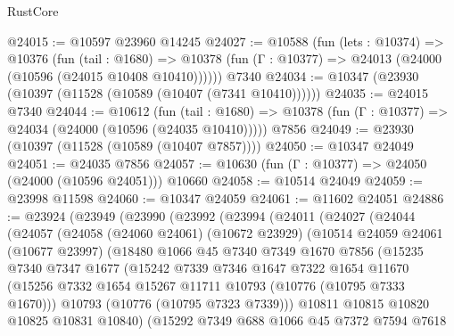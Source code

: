 \begin{lexlean}{RustCore}
\begin{coremodule}
@24015 := @10597 @23960 @14245
@24027 := @10588
    (fun (lets : @10374) =>
    @10376
      (fun (tail : @1680) =>
      @10378 (fun (Γ : @10377) => @24013 (@24000 (@10596 (@24015 @10408 @10410))))))
    @7340
@24034 := @10347 (@23930 (@10397 (@11528 (@10589 (@10407 (@7341 @10410))))))
@24035 := @24015 @7340
@24044 := @10612
    (fun (tail : @1680) => @10378 (fun (Γ : @10377) => @24034 (@24000 (@10596 (@24035 @10410)))))
    @7856
@24049 := @23930 (@10397 (@11528 (@10589 (@10407 @7857))))
@24050 := @10347 @24049
@24051 := @24035 @7856
@24057 := @10630 (fun (Γ : @10377) => @24050 (@24000 (@10596 @24051))) @10660
@24058 := @10514 @24049
@24059 := @23998 @11598
@24060 := @10347 @24059
@24061 := @11602 @24051
@24886 := @23924
    (@23949
      (@23990
        (@23992
          (@23994
            (@24011
              (@24027
                (@24044
                  (@24057
                    (@24058
                      (@24060 @24061)
                      (@10672 @23929)
                      (@10514
                        @24059
                        @24061
                        (@10677 @23997)
                        (@18480
                          @1066
                          @45
                          @7340
                          @7349
                          @1670
                          @7856
                          (@15235
                            @7340
                            @7347
                            @1677
                            (@15242
                              @7339
                              @7346
                              @1647
                              @7322
                              @1654
                              @11670
                              (@15256
                                @7332
                                @1654
                                @15267
                                @11711
                                @10793
                                (@10776 (@10795 @7333 @1670)))
                              @10793
                              (@10776 (@10795 @7323 @7339)))
                            @10811
                            @10815
                            @10820
                            @10825
                            @10831
                            @10840)
                          (@15292
                            @7349
                            @688
                            @1066
                            @45
                            @7372
                            @7594
                            @7618

\end{coremodule}
\end{lexlean}
